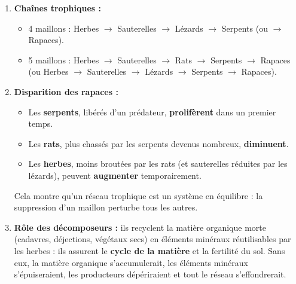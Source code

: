 \documentclass[11pt]{article}
\newcommand{\cle}[1]{{\popxbold\color{popdark}#1}}
\begin{document}
\begin{corrige}
\begin{enumerate}
    \item \textbf{Chaînes trophiques :}
    \begin{itemize}
        \item 4 maillons : Herbes $\rightarrow$ Sauterelles $\rightarrow$ Lézards $\rightarrow$ Serpents (ou $\rightarrow$ Rapaces).
        \item 5 maillons : Herbes $\rightarrow$ Sauterelles $\rightarrow$ Rats $\rightarrow$ Serpents $\rightarrow$ Rapaces (ou Herbes $\rightarrow$ Sauterelles $\rightarrow$ Lézards $\rightarrow$ Serpents $\rightarrow$ Rapaces).
    \end{itemize}
    \item \textbf{Disparition des rapaces :}
    \begin{itemize}
        \item Les \textbf{serpents}, libérés d'un prédateur, \textbf{prolifèrent} dans un premier temps.
        \item Les \textbf{rats}, plus chassés par les serpents devenus nombreux, \textbf{diminuent}.
        \item Les \textbf{herbes}, moins broutées par les rats (et sauterelles réduites par les lézards), peuvent \textbf{augmenter} temporairement.
    \end{itemize}
    Cela montre qu'un réseau trophique est un système en équilibre : la suppression d'un maillon perturbe tous les autres.
    \item \textbf{Rôle des décomposeurs :} ils recyclent la matière organique morte (cadavres, déjections, végétaux secs) en \cle{éléments minéraux} réutilisables par les herbes : ils assurent le \textbf{cycle de la matière} et la fertilité du sol. Sans eux, la matière organique s'accumulerait, les éléments minéraux s'épuiseraient, les producteurs dépériraient et tout le réseau s'effondrerait.
\end{enumerate}
\end{corrige}
\end{document}
